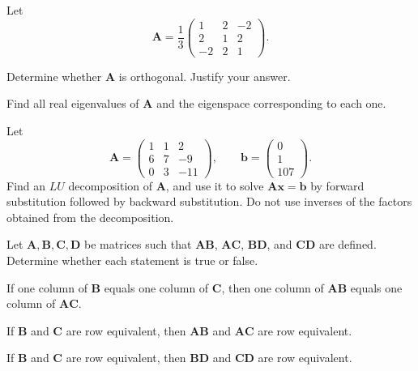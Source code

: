 \documentclass[11pt,oneside]{article}
\begin{document}
\begin{problem}
Let
\[
\mathbf A=\frac13
\begin{pmatrix}
1&2&-2\\
2&1&2\\
-2&2&1
\end{pmatrix}.
\]
\begin{problemsubparts}
\item Determine whether $\mathbf A$ is orthogonal. Justify your answer.
\item Find all real eigenvalues of $\mathbf A$ and the eigenspace corresponding to each one.
\end{problemsubparts}
\end{problem}

\begin{problem}
Let
\[
\mathbf A=
\begin{pmatrix}
1&1&2\\
6&7&-9\\
0&3&-11
\end{pmatrix},
\qquad
\mathbf b=
\begin{pmatrix}0\\1\\107\end{pmatrix}.
\]
Find an $LU$ decomposition of $\mathbf A$, and use it to solve $\mathbf A\mathbf x=\mathbf b$ by forward substitution followed by backward substitution. Do not use inverses of the factors obtained from the decomposition.
\end{problem}

\begin{problem}
Let $\mathbf A,\mathbf B,\mathbf C,\mathbf D$ be matrices such that $\mathbf A\mathbf B$, $\mathbf A\mathbf C$, $\mathbf B\mathbf D$, and $\mathbf C\mathbf D$ are defined. Determine whether each statement is true or false.
\begin{problemsubparts}
\item If one column of $\mathbf B$ equals one column of $\mathbf C$, then one column of $\mathbf A\mathbf B$ equals one column of $\mathbf A\mathbf C$.
\item If $\mathbf B$ and $\mathbf C$ are row equivalent, then $\mathbf A\mathbf B$ and $\mathbf A\mathbf C$ are row equivalent.
\item If $\mathbf B$ and $\mathbf C$ are row equivalent, then $\mathbf B\mathbf D$ and $\mathbf C\mathbf D$ are row equivalent.
\end{problemsubparts}
\end{problem}
\end{document}
